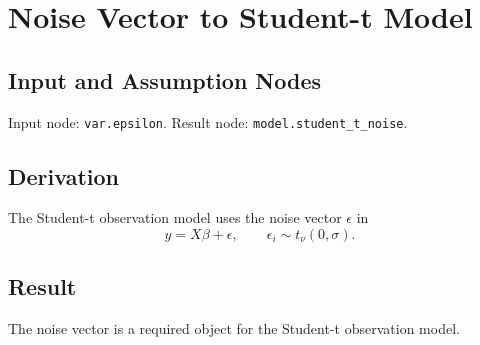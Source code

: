 \section{Noise Vector to Student-t Model}
\label{edge:epsilon-to-student-t-model}

\subsection{Input and Assumption Nodes}
Input node: \texttt{var.epsilon}. Result node: \texttt{model.student\_t\_noise}.

\subsection{Derivation}
The Student-t observation model uses the noise vector \(\epsilon\) in
\[
  y = X\beta + \epsilon,
  \qquad
  \epsilon_i \sim t_\nu(0,\sigma).
\]

\subsection{Result}
The noise vector is a required object for the Student-t observation model.
